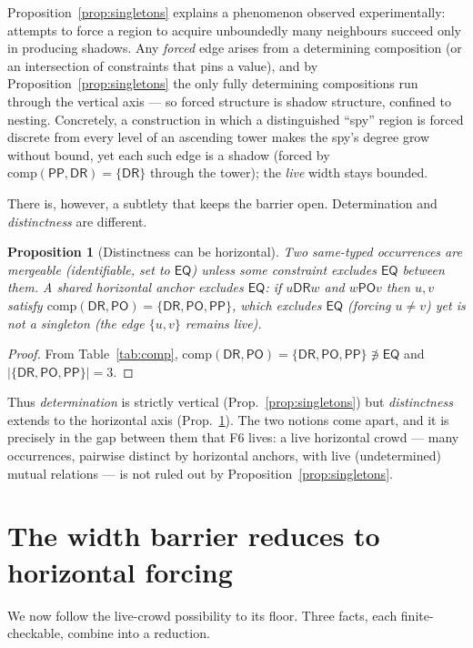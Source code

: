 \documentclass[11pt]{article}
\newcommand{\Comp}{\mathrm{comp}}
\newcommand{\DR}{\mathsf{DR}}
\newcommand{\PO}{\mathsf{PO}}
\newcommand{\PP}{\mathsf{PP}}
\newcommand{\EQ}{\mathsf{EQ}}
\theoremstyle{plain}
\newtheorem{proposition}[theorem]{Proposition}
\theoremstyle{definition}
\begin{document}
Proposition~\ref{prop:singletons} explains a phenomenon observed
experimentally: attempts to force a region to acquire unboundedly many
neighbours succeed only in producing shadows. Any \emph{forced} edge
arises from a determining composition (or an intersection of
constraints that pins a value), and by
Proposition~\ref{prop:singletons} the only fully determining
compositions run through the vertical axis --- so forced structure is
shadow structure, confined to nesting. Concretely, a construction in
which a distinguished ``spy'' region is forced discrete from every
level of an ascending tower makes the spy's degree grow without bound,
yet each such edge is a shadow (forced by $\Comp(\PP,\DR)=\{\DR\}$
through the tower); the \emph{live} width stays bounded.

There is, however, a subtlety that keeps the barrier open. Determination
and \emph{distinctness} are different.

\begin{proposition}[Distinctness can be horizontal]\label{prop:distinct}
Two same-typed occurrences are mergeable (identifiable, set to $\EQ$)
unless some constraint excludes $\EQ$ between them. A shared horizontal
anchor excludes $\EQ$: if $u\mathbin{\DR}w$ and $w\mathbin{\PO}v$ then
$u,v$ satisfy $\Comp(\DR,\PO)=\{\DR,\PO,\PP\}$, which excludes $\EQ$
(forcing $u\neq v$) yet is not a singleton (the edge $\{u,v\}$ remains
live).
\end{proposition}

\begin{proof}
From Table~\ref{tab:comp}, $\Comp(\DR,\PO)=\{\DR,\PO,\PP\}\not\ni\EQ$
and $|\{\DR,\PO,\PP\}|=3$.
\end{proof}

Thus \emph{determination} is strictly vertical
(Prop.~\ref{prop:singletons}) but \emph{distinctness} extends to the
horizontal axis (Prop.~\ref{prop:distinct}). The two notions come
apart, and it is precisely in the gap between them that F6 lives: a
live horizontal crowd --- many occurrences, pairwise distinct by
horizontal anchors, with live (undetermined) mutual relations --- is
not ruled out by Proposition~\ref{prop:singletons}.

\section{The width barrier reduces to horizontal forcing}\label{sec:reduction}

We now follow the live-crowd possibility to its floor. Three facts,
each finite-checkable, combine into a reduction.
\end{document}
